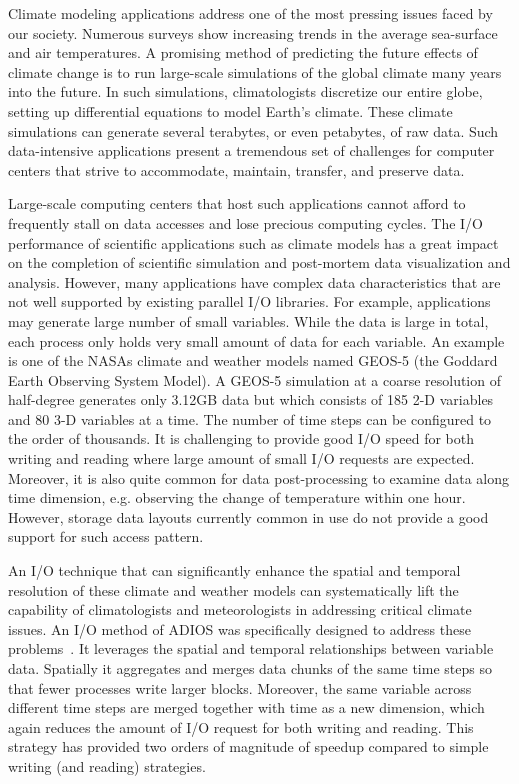 
Climate modeling applications address one of the most pressing issues faced by our society. Numerous
surveys show increasing trends in the average sea-surface and air temperatures. A promising method
of predicting the future effects of climate change is to run large-scale simulations of the global
climate many years into the future. In such simulations, climatologists discretize our entire globe,
setting up differential equations to model Earth's climate. These climate simulations can generate
several terabytes, or even petabytes, of raw data. Such data-intensive applications present a
tremendous set of challenges for computer centers that strive to accommodate, maintain, transfer,
and preserve data.

Large-scale computing centers that host such applications cannot afford to frequently stall on data
accesses and lose precious computing cycles. The I/O performance of scientific applications such as
climate models has a great impact on the completion of scientific simulation and post-mortem data
visualization and analysis. However, many applications have complex data characteristics that are
not well supported by existing parallel I/O libraries. For example, applications may generate large
number of small variables. While the data is large in total, each process only holds very small
amount of data for each variable. An example is one of the NASAs climate and weather models named
GEOS-5 (the Goddard Earth Observing System Model). A GEOS-5 simulation at a coarse resolution of
half-degree generates only 3.12GB data but which consists of 185 2-D variables and 80 3-D variables
at a time. The number of time steps can be configured to the order of thousands. It is challenging
to provide good I/O speed for both writing and reading where large amount of small I/O requests are
expected. Moreover, it is also quite common for data post-processing to examine data along time
dimension, e.g. observing the change of temperature within one hour. However, storage data layouts
currently common in use do not provide a good support for such access pattern.

An I/O technique that can significantly enhance the spatial and temporal resolution of these climate
and weather models can systematically lift the capability of climatologists and meteorologists in
addressing critical climate issues. An I/O method of ADIOS was specifically designed to address
these problems~\cite{ADIOS:Tian:msst13}. It leverages the spatial and temporal relationships between
variable data. Spatially it aggregates and merges data chunks of the same time steps so that fewer
processes write larger blocks. Moreover, the same variable across different time steps are merged
together with time as a new dimension, which again reduces the amount of I/O request for both
writing and reading. This strategy has provided two orders of magnitude of speedup compared to
simple writing (and reading) strategies.





